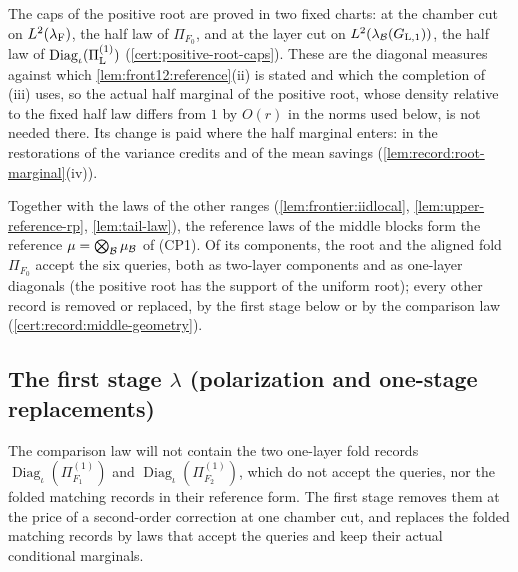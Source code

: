 \begin{remark}\label{rem:root-charts}
The caps of the positive root are proved in two fixed charts: at the chamber
cut on $L^2(\lambda_{\rm F})$, the half law of $\Pi_{F_0}$, and at the layer
cut on $L^2(\lambda_{\mathcal B}(G_{\rm L,1}))$, the half law of
$\operatorname{Diag}_\iota(\Pi^{(1)}_{\rm L})$
(\cref{cert:positive-root-caps}). These are the diagonal measures
against which \cref{lem:front12:reference}(ii) is stated and which the
completion of (iii) uses, so the actual half marginal of the positive root,
whose density relative to the fixed half law differs from $1$ by $O(r)$ in the norms used below, is not needed there. Its change is paid
where the half marginal enters: in the restorations of the variance credits
and of the mean savings (\cref{lem:record:root-marginal}(iv)).
\end{remark}

Together with the laws of the other ranges (\cref{lem:frontier:iidlocal},
\cref{lem:upper-reference-rp}, \cref{lem:tail-law}), the reference laws of
the middle blocks form the reference $\mu=\bigotimes_{\mathcal B}\mu_{\mathcal B}$ of
(CP1). Of its components, the root and the aligned fold $\Pi_{F_0}$ accept
the six queries, both as two-layer components and as one-layer diagonals
(the positive root has the support of the uniform root); every other record
is removed or replaced, by the first stage below or by the comparison law
(\cref{cert:record:middle-geometry}).

\subsection{The first stage \texorpdfstring{$\lambda$}{lambda} (polarization and one-stage replacements)}\label{subsec:middle-first-stage}

The comparison law will not contain the two one-layer fold records
$\operatorname{Diag}_\iota(\Pi^{(1)}_{F_1})$ and
$\operatorname{Diag}_\iota(\Pi^{(1)}_{F_2})$, which do not accept the queries,
nor the folded matching records in their reference form. The first stage
removes them at the price of a second-order correction at one chamber cut,
and replaces the folded matching records by laws that accept the queries
and keep their actual conditional marginals.


